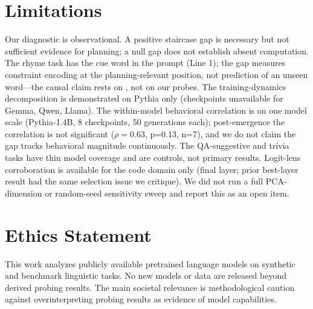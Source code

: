 \documentclass[11pt]{article}
\begin{document}
\section*{Limitations}

Our diagnostic is observational. A positive staircase gap is necessary but not
sufficient evidence for planning; a null gap does not establish absent
computation. The rhyme task has the cue word in the prompt (Line 1); the gap
measures constraint encoding at the planning-relevant position, not prediction
of an unseen word---the causal claim rests on \citet{maar2026}, not on our
probes. The training-dynamics decomposition is demonstrated on Pythia only
(checkpoints unavailable for Gemma, Qwen, Llama). The within-model behavioral
correlation is on one model scale (Pythia-1.4B, 8 checkpoints, 50 generations
each); post-emergence the correlation is not significant ($\rho=0.63$, p=0.13, n=7),
and we do not claim the gap tracks behavioral magnitude continuously. The
QA-suggestive and trivia tasks have thin model coverage and are controls, not
primary results. Logit-lens corroboration is available for the code domain only
(final layer; prior best-layer result had the same selection issue we critique).
We did not run a full PCA-dimension or random-seed sensitivity sweep and report
this as an open item.

\section*{Ethics Statement}

This work analyzes publicly available pretrained language models on synthetic
and benchmark linguistic tasks. No new models or data are released beyond derived
probing results. The main societal relevance is methodological caution against
overinterpreting probing results as evidence of model capabilities.
\end{document}

